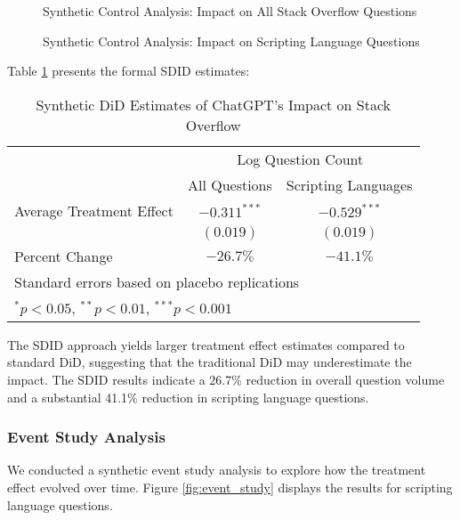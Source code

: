 \begin{figure}[htpb!]
    \centering
    
    \caption{Synthetic Control Analysis: Impact on All Stack Overflow Questions}
    \label{fig:sdid_all}
\end{figure}

\begin{figure}[htpb!]
    \centering
    
    \caption{Synthetic Control Analysis: Impact on Scripting Language Questions}
    \label{fig:sdid_script}
\end{figure}

Table \ref{tab:sdid_results} presents the formal SDID estimates:

\begin{table}[htpb!]
    \centering
    \caption{Synthetic DiD Estimates of ChatGPT's Impact on Stack Overflow}
    \label{tab:sdid_results}
    \begin{tabular}{lcc}
        \toprule
            & \multicolumn{2}{c}{Log Question Count} \\
            \cmidrule(lr){2-3}
            & All Questions & Scripting Languages \\
        \midrule
            Average Treatment Effect & $-0.311^{***}$ & $-0.529^{***}$ \\
            & $(0.019)$      & $(0.019)$ \\
            \midrule
            Percent Change & $-26.7\%$ & $-41.1\%$ \\
        \bottomrule
            \multicolumn{3}{l}{\footnotesize Standard errors based on placebo replications} \\
            \multicolumn{3}{l}{\footnotesize $^{*}p<0.05$, $^{**}p<0.01$, $^{***}p<0.001$} \\
    \end{tabular}
\end{table}

The SDID approach yields larger treatment effect estimates compared to standard DiD, suggesting that the traditional DiD may underestimate the impact. The SDID results indicate a 26.7\% reduction in overall question volume and a substantial 41.1\% reduction in scripting language questions.

\subsubsection{Event Study Analysis}
We conducted a synthetic event study analysis to explore how the treatment effect evolved over time. Figure \ref{fig:event_study} displays the results for scripting language questions.

